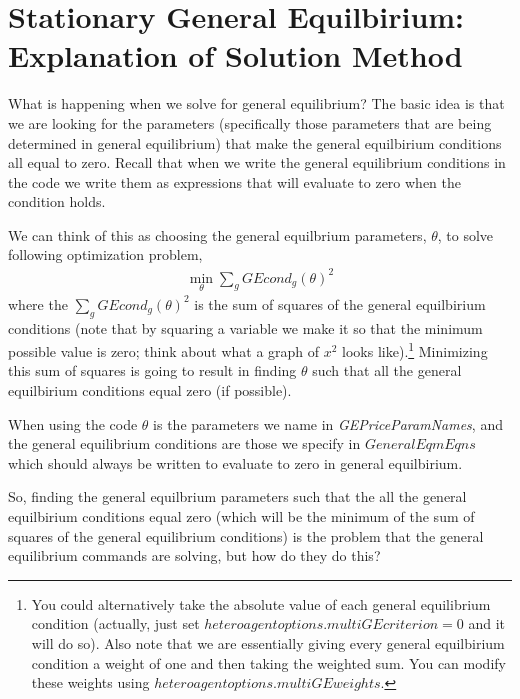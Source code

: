 \section{Stationary General Equilbirium: Explanation of Solution Method}
What is happening when we solve for general equilibrium? The basic idea is that we are looking for the parameters (specifically those parameters that are being determined in general equilibrium) that make the general equilbirium conditions all equal to zero. Recall that when we write the general equilibrium conditions in the code we write them as expressions that will evaluate to zero when the condition holds.

We can think of this as choosing the general equilbrium parameters, $\theta$, to solve following optimization problem,
\begin{eqnarray*}
 \min_{\theta} \sum_g GEcond_g(\theta)^2
\end{eqnarray*}
where the $\sum_g GEcond_g(\theta)^2$ is the sum of squares of the general equilbirium conditions (note that by squaring a variable we make it so that the minimum possible value is zero; think about what a graph of $x^2$ looks like).\footnote{You could alternatively take the absolute value of each general equilibrium condition (actually, just set $heteroagentoptions.multiGEcriterion=0$ and it will do so). Also note that we are essentially giving every general equilbirium condition a weight of one and then taking the weighted sum. You can modify these weights using $heteroagentoptions.multiGEweights$.} Minimizing this sum of squares is going to result in finding $\theta$ such that all the general equilbirium conditions equal zero (if possible).

When using the code $\theta$ is the parameters we name in \textit{GEPriceParamNames}, and the general equilibrium conditions are those we specify in $GeneralEqmEqns$ which should always be written to evaluate to zero in general equilbirium.

So, finding the general equilbrium parameters such that the all the general equilbirium conditions equal zero (which will be the minimum of the sum of squares of the general equilibrium conditions) is the problem that the general equilibrium commands are solving, but how do they do this?

